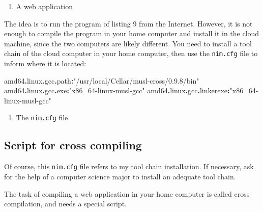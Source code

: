 \documentclass[
  12pt,
]{book}
\newenvironment{Shaded}{}{}
\newcommand{\DataTypeTok}[1]{\textcolor[rgb]{0.56,0.13,0.00}{#1}}
\newcommand{\KeywordTok}[1]{\textcolor[rgb]{0.00,0.44,0.13}{\textbf{#1}}}
\newcommand{\NormalTok}[1]{#1}
\newcommand{\StringTok}[1]{\textcolor[rgb]{0.25,0.44,0.63}{#1}}
\providecommand{\tightlist}{%
  \setlength{\itemsep}{0pt}\setlength{\parskip}{0pt}}
\begin{document}
\begin{enumerate}
\def\labelenumi{(\arabic{enumi})}
\setcounter{enumi}{8}
\tightlist
\item
  A web application
\end{enumerate}

The idea is to run the program of listing 9 from the Internet. However,
it is not enough to compile the program in your home computer and
install it in the cloud machine, since the two computers are likely
different. You need to install a tool chain of the cloud computer in
your home computer, then use the \texttt{nim.cfg} file to inform where
it is located:

\begin{Shaded}
\begin{Highlighting}[]
\NormalTok{amd64}\KeywordTok{.}\DataTypeTok{linux}\KeywordTok{.}\DataTypeTok{gcc}\KeywordTok{.}\DataTypeTok{path}\KeywordTok{:}\StringTok{"/usr/local/Cellar/musl{-}cross/0.9.8/bin"}
\NormalTok{amd64}\KeywordTok{.}\DataTypeTok{linux}\KeywordTok{.}\DataTypeTok{gcc}\KeywordTok{.}\DataTypeTok{exe}\KeywordTok{:}\StringTok{"x86\_64{-}linux{-}musl{-}gcc"}
\NormalTok{amd64}\KeywordTok{.}\DataTypeTok{linux}\KeywordTok{.}\DataTypeTok{gcc}\KeywordTok{.}\DataTypeTok{linkerexe}\KeywordTok{:}\StringTok{"x86\_64{-}linux{-}musl{-}gcc"}
\end{Highlighting}
\end{Shaded}

\begin{enumerate}
\def\labelenumi{(\arabic{enumi})}
\setcounter{enumi}{9}
\tightlist
\item
  The \texttt{nim.cfg} file
\end{enumerate}

\subsection*{Script for cross compiling}\label{ScriptFor}

Of course, this \texttt{nim.cfg} file refers to my tool chain
installation. If necessary, ask for the help of a computer science major
to install an adequate tool chain.

The task of compiling a web application in your home computer is called
cross compilation, and needs a special script.
\end{document}
